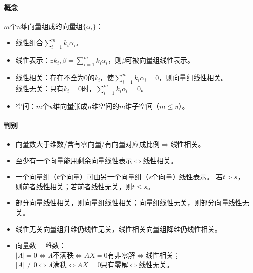 \documentclass[
12pt, %
a4paper, 
oneside, %
headinclude,footinclude, %
]{scrartcl}
\begin{document}
\paragraph{概念}
$ m $个$ n $维向量组成的向量组$ \{\alpha_i\} $：
\begin{itemize}
\item 线性组合$ \sum_{i = 1}^m k_i \alpha_i $。
\item 线性表示：$ \exists k_i, \beta = \sum_{i = 1}^m k_i \alpha_i $，则$ \beta $可被向量组线性表示。
\item 线性相关：存在不全为$ 0 $的$ k_i $，使$ \sum_{i = 1}^m k_i \alpha_i = 0 $，则向量组线性相关。 \\
线性无关：只有$ k_i = 0 $时，$ \sum_{i = 1}^m k_i \alpha_i = 0 $。
\item 空间：$ m $个$ n $维向量张成$ n $维空间的$ m $维子空间（$ m \leq n $）。
\end{itemize}
\paragraph{判别}
\begin{itemize}
\item 向量数大于维数/含有零向量/有向量对应成比例$ \Rightarrow $线性相关。
\item 至少有一个向量能用剩余向量线性表示$ \Leftrightarrow $线性相关。
\item 一个向量组（$ t $个向量）可由另一个向量组（$ s $个向量）线性表示。
若$ t > s $，则前者线性相关；若前者线性无关，则$ t \leq s $。
\item 部分向量线性相关，则向量组线性相关；向量组线性无关，则部分向量线性无关。
\item 线性无关向量组升维仍线性无关，线性相关向量组降维仍线性相关。
\item 向量数$ = $维数： \\
$ |A| = 0 $$ \Leftrightarrow $$ A $不满秩$ \Leftrightarrow $$ AX = 0 $有非零解$ \Leftrightarrow $线性相关； \\
$ |A| \neq 0 $$ \Leftrightarrow $$ A $满秩$ \Leftrightarrow $$ AX = 0 $只有零解$ \Leftrightarrow $线性无关。
\end{itemize}
\end{document}
